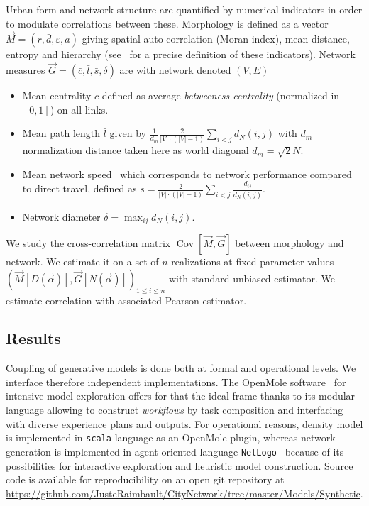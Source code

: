 \documentclass{bmcart}
\DeclareMathOperator{\Cov}{Cov}
\newcommand{\Covb}[2]{\ensuremath{\Cov\!\left[#1,#2\right]}}
\begin{document}
Urban form and network structure are quantified by numerical indicators in order to modulate correlations between these. Morphology is defined as a vector $\vec{M}=(r,\bar{d},\varepsilon,a)$ giving spatial auto-correlation (Moran index), mean distance, entropy and hierarchy (see~\cite{le2015forme} for a precise definition of these indicators). Network measures $\vec{G} = (\bar{c},\bar{l},\bar{s},\delta)$ are with network denoted $(V,E)$
\begin{itemize}
\item Mean centrality $\bar{c}$ defined as average \emph{betweeness-centrality} (normalized in $[0,1]$) on all links.
\item Mean path length $\bar{l}$ given by $\frac{1}{d_m}\frac{2}{|V|\cdot (|V|-1)}\sum_{i<j}d_N(i,j)$ with $d_m$ normalization distance taken here as world diagonal $d_m=\sqrt{2}N$.
\item Mean network speed~\cite{banos2012towards} which corresponds to network performance compared to direct travel, defined as $\bar{s} = \frac{2}{|V|\cdot (|V|-1)}\sum_{i<j}{\frac{d_{ij}}{d_N(i,j)}}$.
\item Network diameter $\delta = \max_{ij}d_N(i,j)$.
\end{itemize}




We study the cross-correlation matrix $\Covb{\vec{M}}{\vec{G}}$ between morphology and network. We estimate it on a set of $n$ realizations at fixed parameter values $(\vec{M}\left[D(\vec{\alpha})\right],\vec{G}\left[N(\vec{\alpha})\right])_{1\leq i\leq n}$ with standard unbiased estimator. We estimate correlation with associated Pearson estimator. 




\subsection*{Results}


Coupling of generative models is done both at formal and operational levels. We interface therefore independent implementations. The OpenMole software~\cite{reuillon2013openmole} for intensive model exploration offers for that the ideal frame thanks to its modular language allowing to construct \emph{workflows} by task composition and interfacing with diverse experience plans and outputs. For operational reasons, density model is implemented in \texttt{scala} language as an OpenMole plugin, whereas network generation is implemented in agent-oriented language \texttt{NetLogo}~\cite{wilensky1999netlogo} because of its possibilities for interactive exploration and heuristic model construction. Source code is available for reproducibility on an open git repository at \url{https://github.com/JusteRaimbault/CityNetwork/tree/master/Models/Synthetic}.
\end{document}
